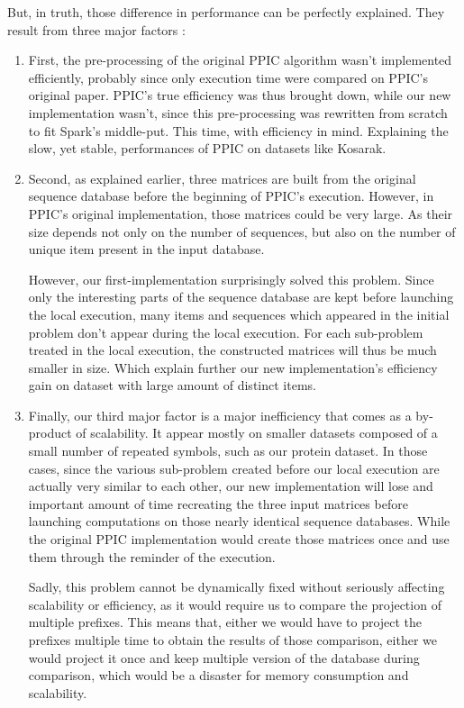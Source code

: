 \documentclass{eplmastersthesis}
\begin{document}
But, in truth, those difference in performance can be perfectly explained. They result from three major factors :
\begin{enumerate}
\item First, the pre-processing of the original PPIC algorithm wasn't implemented efficiently, probably since only execution time were compared on PPIC's original paper. PPIC's true efficiency was thus brought down, while our new implementation wasn't, since this pre-processing was rewritten from scratch to fit Spark's middle-put. This time, with efficiency in mind. Explaining the slow, yet stable, performances of PPIC on datasets like Kosarak.

\item Second, as explained earlier, three matrices are built from the original sequence database before the beginning of PPIC's execution. However, in PPIC's original implementation, those matrices could be very large. As their size depends not only on the number of sequences, but also on the number of unique item present in the input database. \newline
	
	However, our first-implementation surprisingly solved this problem. Since only the interesting parts of the sequence database are kept before launching the local execution, many items and sequences which appeared in the initial problem don't appear during the local execution. For each sub-problem treated in the local execution, the constructed matrices will thus be much smaller in size. Which explain further our new implementation's efficiency gain on dataset with large amount of distinct items.
	
\item Finally, our third major factor is a major inefficiency that comes as a by-product of scalability. It appear mostly on smaller datasets composed of a small number of repeated symbols, such as our protein dataset. In those cases, since the various sub-problem created before our local execution are actually very similar to each other, our new implementation will lose and important amount of time recreating the three input matrices before launching computations on those nearly identical sequence databases. While the original PPIC implementation would create those matrices once and use them through the reminder of the execution. \newline

Sadly, this problem cannot be dynamically fixed without seriously affecting scalability or efficiency, as it would require us to compare the projection of multiple prefixes. This means that, either we would have to project the prefixes multiple time to obtain the results of those comparison, either we would project it once and keep multiple version of the database during comparison, which would be a disaster for memory consumption and scalability.\newline


\end{enumerate}
\end{document}
